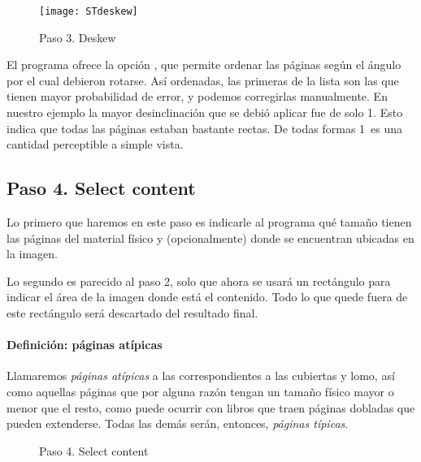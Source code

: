\documentclass[%
	a5paper,
	10pt,
	twoside,
	openright,
	final,
]{memoir}
\begin{document}
{	\begin{figure}
		\centering
		\texttt{[image: STdeskew]}
		\caption{Paso 3. Deskew\label{fig:STdeskew}}
	\end{figure}

	El programa ofrece la opción , que permite ordenar las páginas según el ángulo por el cual debieron rotarse. Así ordenadas, las primeras de la lista son las que tienen mayor probabilidad de error, y podemos corregirlas manualmente. En nuestro ejemplo la mayor desinclinación que se debió aplicar fue de solo 1\textdegree. Esto indica que todas las páginas estaban bastante rectas. De todas formas 1\textdegree\ es una cantidad perceptible a simple vista.

	\subsection{Paso 4. Select content\label{sec:STselectContent}} Lo primero que haremos en este paso es indicarle al programa qué tamaño tienen las páginas del material físico y (opcionalmente) donde se encuentran ubicadas en la imagen.

	Lo segundo es parecido al paso 2, solo que ahora se usará un rectángulo para indicar el área de la imagen donde está el contenido. Todo lo que quede fuera de este rectángulo será descartado del resultado final.

	\paragraph{Definición: páginas atípicas} Llamaremos \emph{páginas atípicas} a las correspondientes a las cubiertas y lomo, así como aquellas páginas que por alguna razón tengan un tamaño físico mayor o menor que el resto, como puede ocurrir con libros que traen páginas dobladas que pueden extenderse. Todas las demás serán, entonces, \emph{páginas típicas}.

	\begin{figure}
		\centering
		\hfill
		\caption{Paso 4. Select content\label{fig:STselectContent}}
	\end{figure}

}
\end{document}
